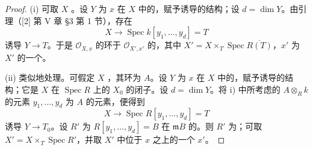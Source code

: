 \begin{proof}
(i) 可取 $X$ 。设 $Y$ 为 $x$ 在 $X$ 中的，赋予诱导的结构；设 $d=\dim Y$。由引理（[2] 第 V 章 §3 第 1 节），存在
\[
 X\longrightarrow\operatorname{Spec}k[y_1,\ldots,y_d]=T
\]
诱导 $Y\to T$。于是 $\mathcal O_{X,x}$ 的环于 $\mathcal O_{X',x'}$ 的，其中 $X'=X\times_T\operatorname{Spec}\overline{R(T)}$，$x'$ 为 $X'$ 的一个。

(ii) 类似地处理。可假定 $X$ ，其环为 $A$。设 $Y$ 为 $x$ 在 $X$ 中的，赋予诱导的结构；它是 $X$ 在 $\operatorname{Spec}R$ 上的 $X_0$ 的闭子。设 $d=\dim Y$。将 i) 中所考虑的 $A\otimes_R k$ 的元素 $y_1,\ldots,y_d$ 为 $A$ 的元素，便得到
\[
 X\longrightarrow\operatorname{Spec}R[y_1,\ldots,y_d]=T
\]
诱导 $Y\to T_0$。设 $R'$ 为 $R[y_1,\ldots,y_d]=B$ 在 $\mathfrak mB$ 的。则 $R'$ 为；可取 $X'=X\times_T\operatorname{Spec}R'$，并取 $X'$ 中位于 $x$ 之上的一个 $x'$。
\end{proof}

